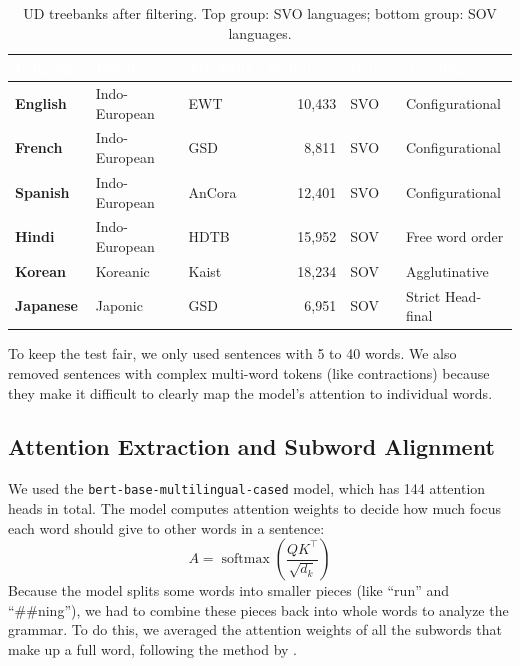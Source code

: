 \documentclass[11pt, a4paper]{article}
\begin{document}
\begin{table}[H]
\vspace{-3pt}
\centering
\caption{UD treebanks after filtering. Top group: SVO languages; bottom group: SOV languages.}
\label{tab:data}
\scriptsize
\setlength{\tabcolsep}{4.5pt}
\begin{tabular}{>{\bfseries}l l l r l l}
\toprule
\rowcolor{headerbg}
\textcolor{white}{Language} & \textcolor{white}{Family} & \textcolor{white}{Treebank} & \textcolor{white}{Sentences} & \textcolor{white}{Order} & \textcolor{white}{Typology} \\
\midrule
\rowcolor{rowalt}
English  & Indo-European & EWT    & 10,433 & SVO & Configurational \\
French   & Indo-European & GSD    &  8,811 & SVO & Configurational \\
\rowcolor{rowalt}
Spanish  & Indo-European & AnCora & 12,401 & SVO & Configurational \\
\midrule
Hindi    & Indo-European & HDTB   & 15,952 & SOV & Free word order \\
\rowcolor{rowalt}
Korean   & Koreanic      & Kaist  & 18,234 & SOV & Agglutinative \\
Japanese & Japonic       & GSD    &  6,951 & SOV & Strict Head-final \\
\bottomrule
\end{tabular}
\vspace{-3pt}
\end{table}

To keep the test fair, we only used sentences with 5 to 40 words. We also removed sentences with complex multi-word tokens (like contractions) because they make it difficult to clearly map the model's attention to individual words.

\subsection{Attention Extraction and Subword Alignment}
We used the \texttt{bert-base-multilingual-cased} model, which has 144 attention heads in total. The model computes attention weights to decide how much focus each word should give to other words in a sentence:
\begin{equation}
A = \operatorname{softmax}\!\left(\frac{QK^\top}{\sqrt{d_k}}\right)
\end{equation}
Because the model splits some words into smaller pieces (like ``run'' and ``\#\#ning''), we had to combine these pieces back into whole words to analyze the grammar. To do this, we averaged the attention weights of all the subwords that make up a full word, following the method by \citet{clark2019what}.
\end{document}
